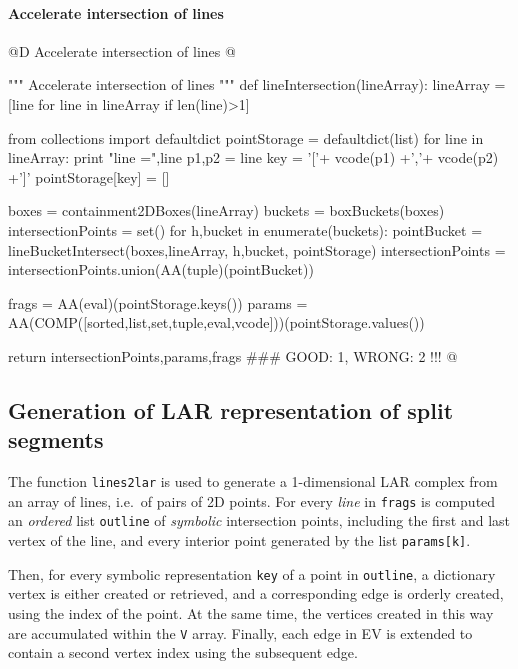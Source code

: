 \documentclass[11pt,oneside]{article}    %
\begin{document}
\paragraph{Accelerate intersection of lines}
@D Accelerate intersection of lines
@{""" Accelerate intersection of lines """
def lineIntersection(lineArray):
    lineArray = [line for line in lineArray if len(line)>1]

    from collections import defaultdict
    pointStorage = defaultdict(list)
    for line in lineArray:
        print "line =",line
        p1,p2 = line
        key = '['+ vcode(p1) +','+ vcode(p2) +']'
        pointStorage[key] = []

    boxes = containment2DBoxes(lineArray)
    buckets = boxBuckets(boxes)
    intersectionPoints = set()
    for h,bucket in enumerate(buckets):
        pointBucket = lineBucketIntersect(boxes,lineArray, h,bucket, pointStorage)
        intersectionPoints = intersectionPoints.union(AA(tuple)(pointBucket))

    frags = AA(eval)(pointStorage.keys())
    params = AA(COMP([sorted,list,set,tuple,eval,vcode]))(pointStorage.values())
        
    return intersectionPoints,params,frags  ### GOOD: 1, WRONG: 2 !!!
@}


\subsection{Generation of LAR representation of split segments}
The function \texttt{lines2lar} is used to generate a 1-dimensional LAR complex from
an array of lines, i.e.~of pairs of 2D points. For every \emph{line} in \texttt{frags}
is computed an \emph{ordered} list \texttt{outline} of \emph{symbolic} intersection points, including 
the first and last vertex of the line, and every interior point generated by the list \texttt{params[k]}.

Then, for every symbolic representation \texttt{key} of a point in \texttt{outline}, a 
dictionary vertex is either created or retrieved, and a corresponding edge is orderly created, using the index of the point.
At the same time, the vertices created in this way are accumulated within the \texttt{V} array.
Finally, each edge in EV is extended to contain a second vertex index using the subsequent edge.  
\end{document}
